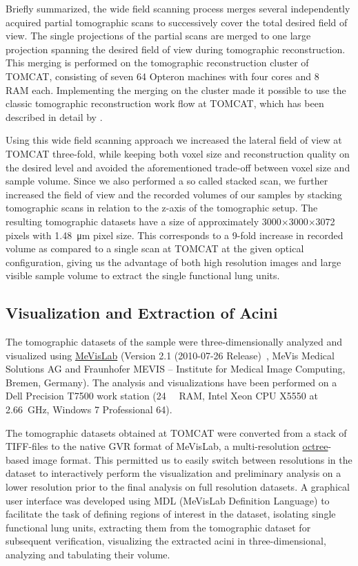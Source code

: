\documentclass[%
	paper=a4,%
	abstract=true,%
	]{scrartcl}
\begin{document}
Briefly summarized, the wide field scanning process merges several independently acquired partial tomographic scans to successively cover the total desired field of view. The single projections of the partial scans are merged to one large projection spanning the desired field of view during tomographic reconstruction. This merging is performed on the tomographic reconstruction cluster of TOMCAT, consisting of seven \SI{64}{\bit} Opteron machines with four cores and \SI{8}{\giga\byte} RAM each. Implementing the merging on the cluster made it possible to use the classic tomographic reconstruction work flow at TOMCAT, which has been described in detail by \citet{Hintermueller2010}.

Using this wide field scanning approach we increased the lateral field of view at TOMCAT three-fold, while keeping both voxel size and reconstruction quality on the desired level and avoided the aforementioned trade-off between voxel size and sample volume. Since we also performed a so called stacked scan, we further increased the field of view and the recorded volumes of our samples by stacking tomographic scans in relation to the z-axis of the tomographic setup. The resulting tomographic datasets have a size of approximately 3000\(\times\)3000\(\times\)3072 pixels with \SI{1.48}{\micro\meter} pixel size. This corresponds to a 9-fold increase in recorded volume as compared to a single scan at TOMCAT at the given optical configuration, giving us the advantage of both high resolution images and large visible sample volume to extract the single functional lung units.

\subsection{Visualization and Extraction of Acini}
The tomographic datasets of the sample were three-dimensionally analyzed and visualized using \href{http://mevislab.de}{MeVisLab} (Version 2.1 (2010-07-26 Release)~\cite{Bitter2007}, MeVis Medical Solutions AG and Fraunhofer MEVIS -- Institute for Medical Image Computing, Bremen, Germany). The analysis and visualizations have been performed on a Dell Precision T7500 work station (\SI{24}{\giga\byte} RAM, Intel Xeon CPU X5550 at \SI{2.66}{\giga\hertz}, Windows 7 Professional \SI{64}{\bit}). 

The tomographic datasets obtained at TOMCAT were converted from a stack of TIFF-files to the native GVR format of MeVisLab, a multi-resolution \href{https://secure.wikimedia.org/wikipedia/en/w/index.php?title=Octree&oldid=409131920}{octree}-based image format. This permitted us to easily switch between resolutions in the dataset to interactively perform the visualization and preliminary analysis on a lower resolution prior to the final analysis on full resolution datasets. A graphical user interface was developed using MDL (MeVisLab Definition Language) to facilitate the task of defining regions of interest in the dataset, isolating single functional lung units, extracting them from the tomographic dataset for subsequent verification, visualizing the extracted acini in three-dimensional, analyzing and tabulating their volume.
\end{document}
